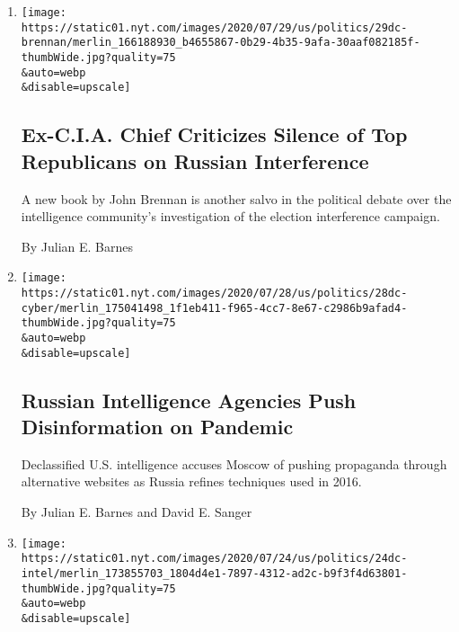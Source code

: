 \begin{enumerate}
\def\labelenumi{\arabic{enumi}.}
\item
  \href{/2020/07/29/us/politics/john-brennan-book.html}{}

  \texttt{[image: https://static01.nyt.com/images/2020/07/29/us/politics/29dc-brennan/merlin\_166188930\_b4655867-0b29-4b35-9afa-30aaf082185f-thumbWide.jpg?quality=75\\\&auto=webp\\\&disable=upscale]}

  \hypertarget{ex-cia-chief-criticizes-silence-of-top-republicans-on-russian-interference}{%
  \subsection{Ex-C.I.A. Chief Criticizes Silence of Top Republicans on
  Russian
  Interference}\label{ex-cia-chief-criticizes-silence-of-top-republicans-on-russian-interference}}

  A new book by John Brennan is another salvo in the political debate
  over the intelligence community's investigation of the election
  interference campaign.

  By Julian E. Barnes
\item
  \href{/2020/07/28/us/politics/russia-disinformation-coronavirus.html}{}

  \texttt{[image: https://static01.nyt.com/images/2020/07/28/us/politics/28dc-cyber/merlin\_175041498\_1f1eb411-f965-4cc7-8e67-c2986b9afad4-thumbWide.jpg?quality=75\\\&auto=webp\\\&disable=upscale]}

  \hypertarget{russian-intelligence-agencies-push-disinformation-on-pandemic}{%
  \subsection{Russian Intelligence Agencies Push Disinformation on
  Pandemic}\label{russian-intelligence-agencies-push-disinformation-on-pandemic}}

  Declassified U.S. intelligence accuses Moscow of pushing propaganda
  through alternative websites as Russia refines techniques used in
  2016.

  By Julian E. Barnes and David E. Sanger
\item
  \href{/2020/07/24/us/politics/election-interference-russia-china-iran.html}{}

  \texttt{[image: https://static01.nyt.com/images/2020/07/24/us/politics/24dc-intel/merlin\_173855703\_1804d4e1-7897-4312-ad2c-b9f3f4d63801-thumbWide.jpg?quality=75\\\&auto=webp\\\&disable=upscale]}


\end{enumerate}
